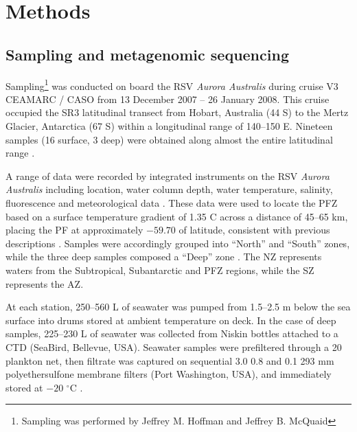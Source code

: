 \section{Methods}
\subsection{Sampling and metagenomic sequencing}

Sampling\footnote{Sampling was performed by Jeffrey M. Hoffman and Jeffrey B. McQuaid} was conducted on board the RSV \emph{Aurora Australis} during cruise V3 \ac{CEAMARC} / \ac{CASO} from 13 December 2007 -- 26 January 2008. 
This cruise occupied the SR3 latitudinal transect from Hobart, Australia (44\textdegree{} S) to the Mertz Glacier, Antarctica (67\textdegree{} S) within a longitudinal range of 140--150\textdegree{} E.
Nineteen samples (16 surface, 3 deep) were obtained along almost the entire latitudinal range .



A range of data were recorded by integrated instruments on the RSV \emph{Aurora Australis} including location, water column depth, water temperature, salinity, fluorescence and meteorological data .
These data were used to locate the \ac{PFZ} based on a surface temperature gradient of \textapprox{} 1.35 \textdegree{}C across a distance of 45--65 km, placing the \ac{PF} at approximately $-59.70$\textdegree{} of latitude, consistent with previous descriptions \cite{Moore:1999to,Sokolov:2002tc}.
Samples were accordingly grouped into ``North'' and ``South'' zones, while the three deep samples composed a ``Deep'' zone .
The \ac{NZ} represents waters from the Subtropical, Subantarctic and \ac{PFZ} regions, while the \ac{SZ} represents the \ac{AZ}.



At each station, \textapprox{} 250--560 L of seawater was pumped from \textapprox{} 1.5--2.5 m below the sea surface into drums stored at ambient temperature on deck. 
In the case of deep samples, \textapprox{} 225--230 L of seawater was collected from Niskin bottles attached to a \ac{CTD} (SeaBird, Bellevue, USA).
Seawater samples were prefiltered through a 20 \micron{} plankton net, then filtrate was captured on sequential 3.0 \micron{} 0.8 \micron{} and 0.1 \micron{} 293 mm polyethersulfone membrane filters (Port Washington, USA), and immediately stored at $-20$ $^\circ$C \cite{Rusch:2007ez,Ng:2010cd}.

